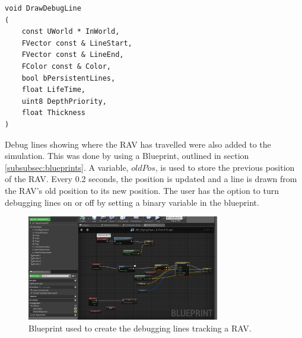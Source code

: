 \begin{verbatim}
void DrawDebugLine
(
    const UWorld * InWorld,
    FVector const & LineStart,
    FVector const & LineEnd,
    FColor const & Color,
    bool bPersistentLines,
    float LifeTime,
    uint8 DepthPriority,
    float Thickness
)
\end{verbatim}
\par


Debug lines showing where the RAV has travelled were also added to the simulation. This was done by using a Blueprint, outlined in section \ref{subsubsec:blueprints}. A variable, $oldPos$, is used to store the previous position of the RAV. Every 0.2 seconds, the position is updated and a line is drawn from the RAV's old position to its new position. The user has the option to turn debugging lines on or off by setting a binary variable in the blueprint.

\begin{figure}
    \centering
    \includegraphics[width=0.75\textwidth]{Chapters/SimulationEnv/Figs/DebuggingLines/PathTracingDebugLines.png}
    \caption{Blueprint used to create the debugging lines tracking a RAV.}
    \label{fig:TracingDebuggingLines}
\end{figure}


